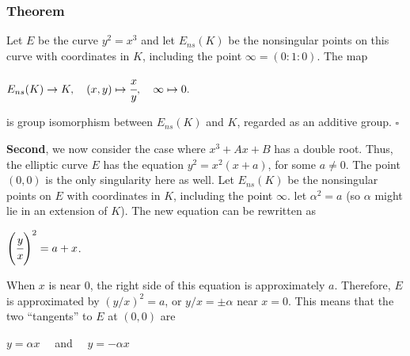 \documentclass[a4paper, 12pt]{article}
\begin{document}
\subsubsection{Theorem}
Let $E$ be the curve $y^2=x^3$ and let $E_{ns}(K)$ be the nonsingular points on this curve with coordinates in $K$, including the point $\infty = (0:1:0).$ The map
\begin{center} $E_{ns}(K) \rightarrow K, \quad (x,y) \mapsto \cfrac{x}{y}, \quad \infty \mapsto 0.$ \end{center}
is group isomorphism between $E_{ns}(K)$ and $K$, regarded as an additive group. $\square$\par
\textbf{Second}, we now consider the case where $x^3+Ax+B$ has a double root. Thus, the elliptic curve $E$ has the equation $y^2=x^2(x+a)$, for some $a \neq 0$. The point $(0,0)$ is the only singularity here as well. Let $E_{ns}(K)$ be the nonsingular points on $E$ with coordinates in $K$, including the point $\infty$. let $\alpha^2 = a$ (so $\alpha$ might lie in an extension of $K$). 
\newline The new equation can be rewritten as
\begin{center} $\left(\cfrac{y}{x}\right)^2 = a + x$. \end{center}
When $x$ is near 0, the right side of this equation is approximately $a$. Therefore, $E$ is approximated by $(y/x)^2 = a$, or $y/x = \pm \alpha$ near $x=0$. 
\newline This means that the two ``tangents'' to $E$ at $(0,0)$ are
\begin{center} $y=\alpha x \quad$ and $\quad y = -\alpha x$ \end{center}
\end{document}
